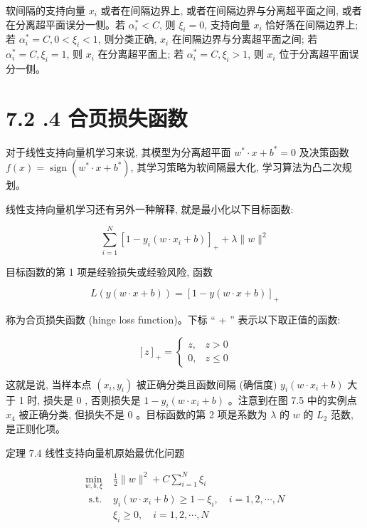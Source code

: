 \documentclass[10pt]{article}
\begin{document}
软间隔的支持向量 $x_{i}$ 或者在间隔边界上, 或者在间隔边界与分离超平面之间, 或者在分离超平面误分一侧。若 $\alpha_{i}^{*}<C$, 则 $\xi_{i}=0$, 支持向量 $x_{i}$ 恰好落在间隔边界上; 若 $\alpha_{i}^{*}=C, 0<\xi_{i}<1$, 则分类正确, $x_{i}$ 在间隔边界与分离超平面之间; 若 $\alpha_{i}^{*}=C, \xi_{i}=1$, 则 $x_{i}$ 在分离超平面上; 若 $\alpha_{i}^{*}=C, \xi_{i}>1$, 则 $x_{i}$ 位于分离超平面误分一侧。

\section*{7.2 .4 合页损失函数}
对于线性支持向量机学习来说, 其模型为分离超平面 $w^{*} \cdot x+b^{*}=0$ 及决策函数 $f(x)=\operatorname{sign}\left(w^{*} \cdot x+b^{*}\right)$, 其学习策略为软间隔最大化, 学习算法为凸二次规划。

线性支持向量机学习还有另外一种解释, 就是最小化以下目标函数:


\begin{equation*}
\sum_{i=1}^{N}\left[1-y_{i}\left(w \cdot x_{i}+b\right)\right]_{+}+\lambda\|w\|^{2} \tag{7.57}
\end{equation*}


目标函数的第 1 项是经验损失或经验风险, 函数


\begin{equation*}
L(y(w \cdot x+b))=[1-y(w \cdot x+b)]_{+} \tag{7.58}
\end{equation*}


称为合页损失函数 (hinge loss function)。下标 “ + ” 表示以下取正值的函数:

\[
[z]_{+}= \begin{cases}z, & z>0  \tag{7.59}\\ 0, & z \leqslant 0\end{cases}
\]

这就是说, 当样本点 $\left(x_{i}, y_{i}\right)$ 被正确分类且函数间隔 (确信度) $y_{i}\left(w \cdot x_{i}+b\right)$ 大于 1 时, 损失是 0 , 否则损失是 $1-y_{i}\left(w \cdot x_{i}+b\right)$ 。注意到在图 7.5 中的实例点 $x_{4}$ 被正确分类, 但损失不是 0 。目标函数的第 2 项是系数为 $\lambda$ 的 $w$ 的 $L_{2}$ 范数, 是正则化项。

定理 7.4 线性支持向量机原始最优化问题

\[
\begin{array}{ll}
\min _{w, b, \xi} & \frac{1}{2}\|w\|^{2}+C \sum_{i=1}^{N} \xi_{i} \\
\text { s.t. } & y_{i}\left(w \cdot x_{i}+b\right) \geqslant 1-\xi_{i}, \quad i=1,2, \cdots, N \\
& \xi_{i} \geqslant 0, \quad i=1,2, \cdots, N \tag{7.62}
\end{array}
\]
\end{document}
